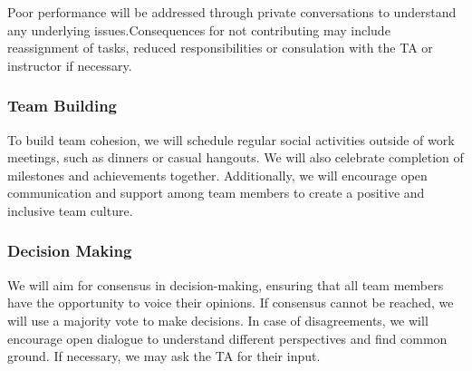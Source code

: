 \documentclass{article}
\begin{document}
Poor performance will be addressed through private conversations to understand any underlying issues.Consequences for not contributing may include reassignment of tasks, reduced responsibilities or consulation with the TA or instructor if necessary.



\subsubsection*{Team Building}


To build team cohesion, we will schedule regular social activities outside of work meetings, such as dinners or casual hangouts. We will also celebrate completion of milestones and achievements together. Additionally, we will encourage open communication and support among team members to create a positive and inclusive team culture.

\subsubsection*{Decision Making} 


We will aim for consensus in decision-making, ensuring that all team members have the opportunity to voice their opinions. If consensus cannot be reached, we will use a majority vote to make decisions. In case of disagreements, we will encourage open dialogue to understand different perspectives and find common ground. If necessary, we may ask the TA for their input.
\end{document}

